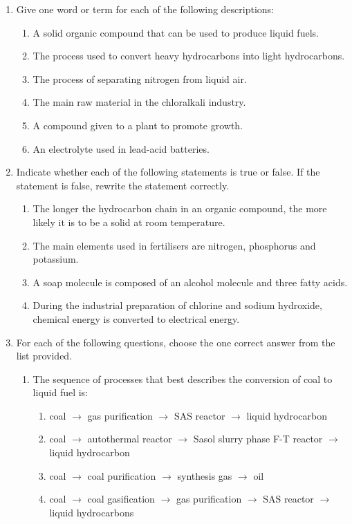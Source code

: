 \begin{eocexercises}{}

\begin{enumerate}
\item{Give one word or term for each of the following descriptions:}
	\begin{enumerate}
	\item{A solid organic compound that can be used to produce liquid fuels.}
	\item{The process used to convert heavy hydrocarbons into light hydrocarbons.}
	\item{The process of separating nitrogen from liquid air.}
	\item{The main raw material in the chloralkali industry.}
	\item{A compound given to a plant to promote growth.}
	\item{An electrolyte used in lead-acid batteries.}
	\end{enumerate}

\item{Indicate whether each of the following statements is true or false. If the statement is false, rewrite the statement correctly.}
	\begin{enumerate}
	\item{The longer the hydrocarbon chain in an organic compound, the more likely it is to be a solid at room temperature.}
	\item{The main elements used in fertilisers are nitrogen, phosphorus and potassium.}
	\item{A soap molecule is composed of an alcohol molecule and three fatty acids.}
	\item{During the industrial preparation of chlorine and sodium hydroxide, chemical energy is converted to electrical energy.}
	\end{enumerate}

\item{For each of the following questions, choose the one correct answer from the list provided.}

	\begin{enumerate}
	\item{The sequence of processes that best describes the conversion of coal to liquid fuel is:}
		\begin{enumerate}
		\item{coal $\rightarrow$ gas purification $\rightarrow$ SAS reactor $\rightarrow$ liquid hydrocarbon}
		\item{coal $\rightarrow$ autothermal reactor $\rightarrow$ Sasol slurry phase F-T reactor $\rightarrow$ liquid hydrocarbon}
		\item{coal $\rightarrow$ coal purification $\rightarrow$ synthesis gas $\rightarrow$ oil}
		\item{coal $\rightarrow$ coal gasification $\rightarrow$ gas purification $\rightarrow$ SAS reactor $\rightarrow$ liquid hydrocarbons}
		\end{enumerate}


\end{enumerate}
\end{enumerate}
\end{eocexercises}
